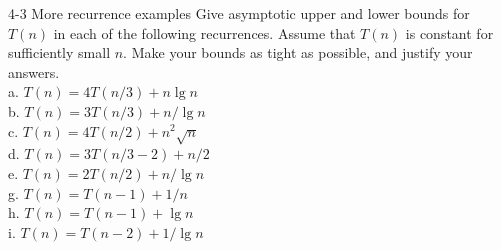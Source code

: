 \documentclass[a4paper, justified]{tufte-handout}
\begin{document}
\begin{problem}
4-3 More recurrence examples Give asymptotic upper and lower bounds for $T(n)$ in each of the following recurrences. Assume that $T(n)$ is constant for sufficiently small $n .$ Make your bounds as tight as possible, and justify your answers.\\
a. $T(n)=4 T(n / 3)+n \lg n$\\
b. $T(n)=3 T(n / 3)+n / \lg n$\\
c. $T(n)=4 T(n / 2)+n^{2} \sqrt{n}$\\
d. $T(n)=3 T(n / 3-2)+n / 2$\\
e. $T(n)=2 T(n / 2)+n / \lg n$\\
g. $T(n)=T(n-1)+1 / n$\\
h. $T(n)=T(n-1)+\lg n$\\
i. $T(n)=T(n-2)+1 / \lg n$
\end{problem}
\end{document}
